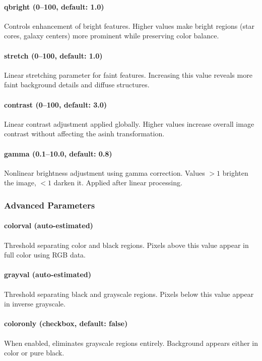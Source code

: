 \documentclass[11pt,a4paper]{article}
\begin{document}
\paragraph{qbright (0--100, default: 1.0)}
Controls enhancement of bright features. Higher values make bright regions
(star cores, galaxy centers) more prominent while preserving color balance.

\paragraph{stretch (0--100, default: 1.0)}
Linear stretching parameter for faint features. Increasing this value
reveals more faint background details and diffuse structures.

\paragraph{contrast (0--100, default: 3.0)}
Linear contrast adjustment applied globally. Higher values increase overall
image contrast without affecting the asinh transformation.

\paragraph{gamma (0.1--10.0, default: 0.8)}
Nonlinear brightness adjustment using gamma correction. Values $> 1$
brighten the image, $< 1$ darken it. Applied after linear processing.

\subsubsection{Advanced Parameters}

\paragraph{colorval (auto-estimated)}
Threshold separating color and black regions. Pixels above this value
appear in full color using RGB data.

\paragraph{grayval (auto-estimated)}
Threshold separating black and grayscale regions. Pixels below this value
appear in inverse grayscale.

\paragraph{coloronly (checkbox, default: false)}
When enabled, eliminates grayscale regions entirely. Background appears
either in color or pure black.
\end{document}
